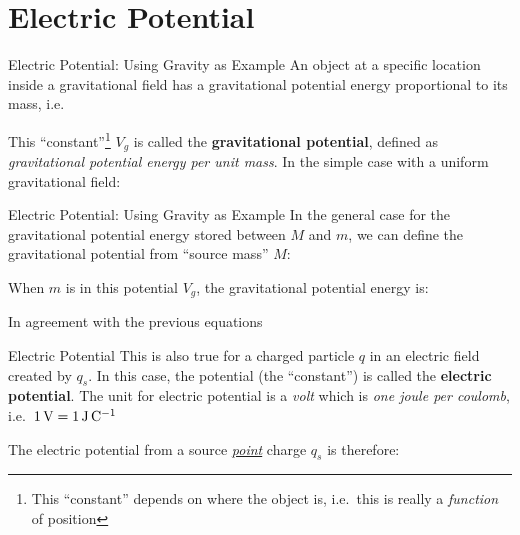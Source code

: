 \documentclass[12pt,aspectratio=169]{beamer}
\begin{document}
\section{Electric Potential}

\begin{frame}{Electric Potential: Using Gravity as Example}
  An object at a specific location inside a gravitational field has a
  gravitational potential energy proportional to its mass, i.e.\

  
  This ``constant''\footnote{This ``constant'' depends on where the object is,
  i.e.\ this is really a \emph{function} of position} $V_g$ is called the
  \textbf{gravitational potential}, defined as
  \emph{gravitational potential energy per unit mass}. In the simple case with
  a uniform gravitational field:


\end{frame}



\begin{frame}{Electric Potential: Using Gravity as Example}
  In the general case for the gravitational potential energy stored between
  $M$ and $m$, we can define the gravitational potential from ``source mass''
  $M$:
  

  When $m$ is in this potential $V_g$, the gravitational potential energy is:


  In agreement with the previous equations
\end{frame}



\begin{frame}{Electric Potential}
  This is also true for a charged particle $q$ in an electric field
  created by $q_s$. In this case, the potential (the ``constant'') is called the
  \textbf{electric potential}. The unit for electric potential is a \emph{volt}
  which is \emph{one joule per coulomb}, i.e.\
  $\SI1\volt=\SI1{\joule\per\coulomb}$


  The electric potential from a source \underline{\emph{point}} charge $q_s$ is
  therefore:

\end{frame}
\end{document}
